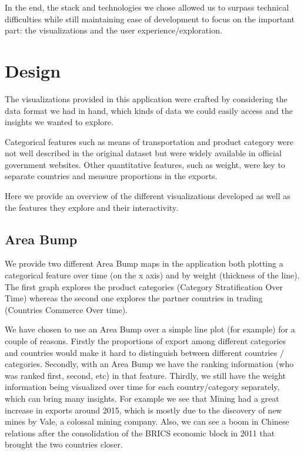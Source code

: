 \documentclass[12pt,a4]{article}
\begin{document}
In the end, the stack and technologies we chose allowed us to surpass technical difficulties while still maintaining ease of development to focus on the important part: the visualizations and the user experience/exploration.


\section{Design}

The visualizations provided in this application were crafted by considering the data format we had in hand, which kinds of data we could easily access and the insights we wanted to explore. 

Categorical features such as means of transportation and product category were not well described in the original dataset but were widely available in official government websites. Other quantitative features, such as weight, were key to separate countries and measure proportions in the exports.

Here we provide an overview of the different visualizations developed as well as the features they explore and their interactivity.

\subsection{Area Bump}

We provide two different Area Bump maps in the application both plotting a categorical feature over time (on the x axis) and by weight (thickness of the line). The first graph explores the product categories (Category Stratification Over Time) whereas the second one explores the partner countries in trading (Countries Commerce Over time).

We have chosen to use an Area Bump over a simple line plot (for example) for a couple of reasons. Firstly the proportions of export among different categories and countries would make it hard to distinguish between different countries / categories. Secondly, with an Area Bump we have the ranking information (who was ranked first, second, etc) in that feature. Thirdly, we still have the weight information being visualized over time for each country/category separately, which can bring many insights. For example we see that Mining had a great increase in exports around 2015, which is mostly due to the discovery of new mines by Vale, a colossal mining company. Also, we can see a boom in Chinese relations after the consolidation of the BRICS economic block in 2011 that brought the two countries closer.
\end{document}
